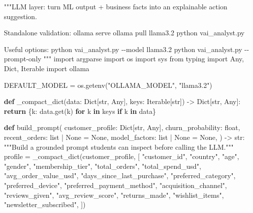 \documentclass[
  indonesian,
  letterpaper,
  DIV=11,
  numbers=noendperiod]{scrreprt}
\newenvironment{Shaded}{\begin{snugshade}}{\end{snugshade}}
\newcommand{\BuiltInTok}[1]{\textcolor[rgb]{0.00,0.23,0.31}{#1}}
\newcommand{\CommentTok}[1]{\textcolor[rgb]{0.37,0.37,0.37}{#1}}
\newcommand{\ControlFlowTok}[1]{\textcolor[rgb]{0.00,0.23,0.31}{\textbf{#1}}}
\newcommand{\ImportTok}[1]{\textcolor[rgb]{0.00,0.46,0.62}{#1}}
\newcommand{\KeywordTok}[1]{\textcolor[rgb]{0.00,0.23,0.31}{\textbf{#1}}}
\newcommand{\NormalTok}[1]{\textcolor[rgb]{0.00,0.23,0.31}{#1}}
\newcommand{\OperatorTok}[1]{\textcolor[rgb]{0.37,0.37,0.37}{#1}}
\newcommand{\StringTok}[1]{\textcolor[rgb]{0.13,0.47,0.30}{#1}}
\newcommand{\VariableTok}[1]{\textcolor[rgb]{0.07,0.07,0.07}{#1}}
\begin{document}
\begin{Shaded}
\begin{Highlighting}[]
\CommentTok{"""LLM layer: turn ML output + business facts into an explainable action suggestion.}

\CommentTok{Standalone validation:}
\CommentTok{    ollama serve}
\CommentTok{    ollama pull llama3.2}
\CommentTok{    python vai\_analyst.py}

\CommentTok{Useful options:}
\CommentTok{    python vai\_analyst.py {-}{-}model llama3.2}
\CommentTok{    python vai\_analyst.py {-}{-}prompt{-}only}
\CommentTok{"""}
\ImportTok{import}\NormalTok{ argparse}
\ImportTok{import}\NormalTok{ os}
\ImportTok{import}\NormalTok{ sys}
\ImportTok{from}\NormalTok{ typing }\ImportTok{import}\NormalTok{ Any, Dict, Iterable}
\ImportTok{import}\NormalTok{ ollama}

\NormalTok{DEFAULT\_MODEL }\OperatorTok{=}\NormalTok{ os.getenv(}\StringTok{"OLLAMA\_MODEL"}\NormalTok{, }\StringTok{"llama3.2"}\NormalTok{)}


\KeywordTok{def}\NormalTok{ \_compact\_dict(data: Dict[}\BuiltInTok{str}\NormalTok{, Any], keys: Iterable[}\BuiltInTok{str}\NormalTok{]) }\OperatorTok{{-}\textgreater{}}\NormalTok{ Dict[}\BuiltInTok{str}\NormalTok{, Any]:}
    \ControlFlowTok{return}\NormalTok{ \{k: data.get(k) }\ControlFlowTok{for}\NormalTok{ k }\KeywordTok{in}\NormalTok{ keys }\ControlFlowTok{if}\NormalTok{ k }\KeywordTok{in}\NormalTok{ data\}}


\KeywordTok{def}\NormalTok{ build\_prompt(}
\NormalTok{    customer\_profile: Dict[}\BuiltInTok{str}\NormalTok{, Any],}
\NormalTok{    churn\_probability: }\BuiltInTok{float}\NormalTok{,}
\NormalTok{    recent\_orders: }\BuiltInTok{list} \OperatorTok{|} \VariableTok{None} \OperatorTok{=} \VariableTok{None}\NormalTok{,}
\NormalTok{    model\_factors: }\BuiltInTok{list} \OperatorTok{|} \VariableTok{None} \OperatorTok{=} \VariableTok{None}\NormalTok{,}
\NormalTok{) }\OperatorTok{{-}\textgreater{}} \BuiltInTok{str}\NormalTok{:}
    \CommentTok{"""Build a grounded prompt students can inspect before calling the LLM."""}
\NormalTok{    profile }\OperatorTok{=}\NormalTok{ \_compact\_dict(customer\_profile, [}
        \StringTok{"customer\_id"}\NormalTok{, }\StringTok{"country"}\NormalTok{, }\StringTok{"age"}\NormalTok{, }\StringTok{"gender"}\NormalTok{, }\StringTok{"membership\_tier"}\NormalTok{,}
        \StringTok{"total\_orders"}\NormalTok{, }\StringTok{"total\_spend\_usd"}\NormalTok{, }\StringTok{"avg\_order\_value\_usd"}\NormalTok{,}
        \StringTok{"days\_since\_last\_purchase"}\NormalTok{, }\StringTok{"preferred\_category"}\NormalTok{, }\StringTok{"preferred\_device"}\NormalTok{,}
        \StringTok{"preferred\_payment\_method"}\NormalTok{, }\StringTok{"acquisition\_channel"}\NormalTok{, }\StringTok{"reviews\_given"}\NormalTok{,}
        \StringTok{"avg\_review\_score"}\NormalTok{, }\StringTok{"returns\_made"}\NormalTok{, }\StringTok{"wishlist\_items"}\NormalTok{,}
        \StringTok{"newsletter\_subscribed"}\NormalTok{,}
\NormalTok{    ])}


\end{Highlighting}
\end{Shaded}
\end{document}
